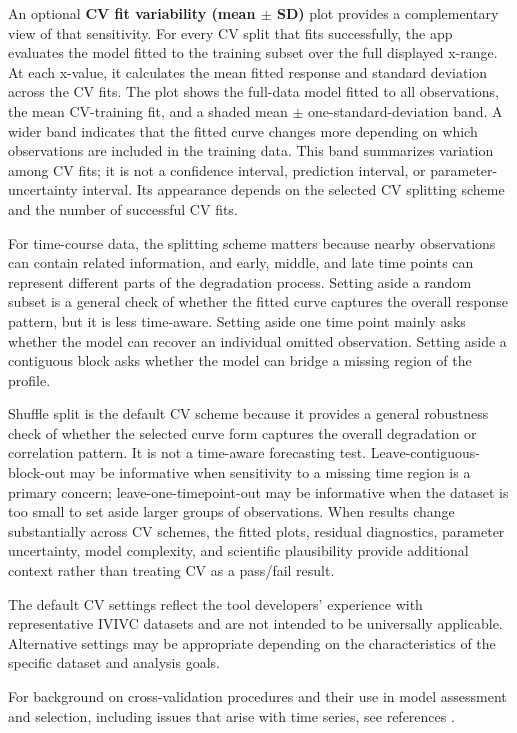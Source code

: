 An optional \textbf{CV fit variability (mean $\pm$ SD)} plot provides a complementary view of that sensitivity. For every CV split that fits successfully, the app evaluates the model fitted to the training subset over the full displayed x-range. At each x-value, it calculates the mean fitted response and standard deviation across the CV fits. The plot shows the full-data model fitted to all observations, the mean CV-training fit, and a shaded mean $\pm$ one-standard-deviation band. A wider band indicates that the fitted curve changes more depending on which observations are included in the training data. This band summarizes variation among CV fits; it is not a confidence interval, prediction interval, or parameter-uncertainty interval. Its appearance depends on the selected CV splitting scheme and the number of successful CV fits.

For time-course data, the splitting scheme matters because nearby observations can contain related information, and early, middle, and late time points can represent different parts of the degradation process. Setting aside a random subset is a general check of whether the fitted curve captures the overall response pattern, but it is less time-aware. Setting aside one time point mainly asks whether the model can recover an individual omitted observation. Setting aside a contiguous block asks whether the model can bridge a missing region of the profile.

Shuffle split is the default CV scheme because it provides a general robustness check of whether the selected curve form captures the overall degradation or correlation pattern. It is not a time-aware forecasting test. Leave-contiguous-block-out may be informative when sensitivity to a missing time region is a primary concern; leave-one-timepoint-out may be informative when the dataset is too small to set aside larger groups of observations. When results change substantially across CV schemes, the fitted plots, residual diagnostics, parameter uncertainty, model complexity, and scientific plausibility provide additional context rather than treating CV as a pass/fail result.

The default CV settings reflect the tool developers' experience with representative IVIVC datasets and are not intended to be universally applicable. Alternative settings may be appropriate depending on the characteristics of the specific dataset and analysis goals.

For background on cross-validation procedures and their use in model assessment and selection, including issues that arise with time series, see references \cite{arlot2010, bergmeir2012, roberts2017, bergmeir2018}.

